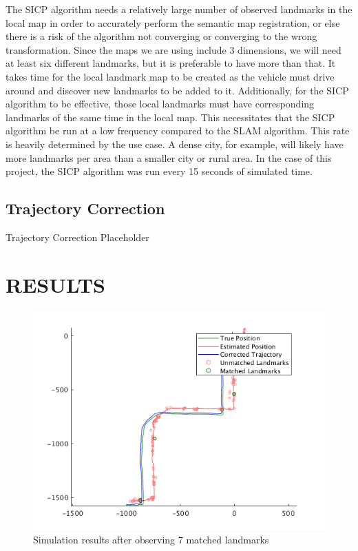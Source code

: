 \documentclass[letterpaper, 10 pt, conference]{ieeeconf}  %
\begin{document}
The SICP algorithm needs a relatively large number of observed landmarks in the local map in order to accurately perform the semantic map registration, or else there is a risk of the algorithm not converging or converging to the wrong transformation. Since the maps we are using include 3 dimensions, we will need at least six different landmarks, but it is preferable to have more than that. It takes time for the local landmark map to be created as the vehicle must drive around and discover new landmarks to be added to it. Additionally, for the SICP algorithm to be effective, those local landmarks must have corresponding landmarks of the same time in the local map. This necessitates that the SICP algorithm be run at a low frequency compared to the SLAM algorithm. This rate is heavily determined by the use case. A dense city, for example, will likely have more landmarks per area than a smaller city or rural area. In the case of this project, the SICP algorithm was run every 15 seconds of simulated time.


\subsection{Trajectory Correction}

Trajectory Correction Placeholder


\section{RESULTS}

\begin{figure}[thpb]
  \centering
  \includegraphics[width=\linewidth]{sim_results.png}
  \caption{Simulation results after observing 7 matched landmarks}
  \label{fig:simresults}
\end{figure}
\end{document}
